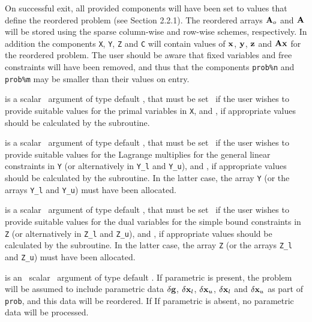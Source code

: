 \documentclass{galahad}
\begin{document}
\begin{description}

On successful exit, all provided components will have been set to values
that define the reordered problem (see Section 2.2.1). The reordered
arrays ${\mathbf{A}}_o$ and ${\mathbf{A}}$ will be stored using the sparse column-wise and
row-wise schemes, respectively. In addition the components
{\tt X}, {\tt Y}, {\tt Z} and {\tt C} will contain values of
${\mathbf{x}}$, ${\mathbf{y}}$, ${\mathbf{z}}$ and ${\mathbf{A}} {\mathbf{x}}$ for the reordered problem.
The user should be aware that fixed variables and free constraints will have
been removed, and thus that the components {\tt prob\%n} and {\tt prob\%m}
may be smaller than their values on entry.

 is a scalar \intentin\ argument of type default \logical, that
must be set \false\ if the user wishes to provide suitable values for the
primal variables in {\tt X}, and \true, if appropriate values should be
calculated by the subroutine.

 is a scalar \intentin\ argument of type default \logical, that
must be set \false\ if the user wishes to provide suitable values for the
Lagrange multiplies for the general linear constraints in {\tt Y}
(or alternatively in {\tt Y\_l} and {\tt Y\_u}),
and \true, if appropriate values should be calculated by the subroutine.
In the latter case, the array {\tt Y} (or the arrays {\tt Y\_l} and {\tt Y\_u})
must have been allocated.

 is a scalar \intentin\ argument of type default \logical, that
must be set \false\ if the user wishes to provide suitable values for the
dual variables for the simple bound constraints in {\tt Z}
(or alternatively in {\tt Z\_l} and {\tt Z\_u}), and \true,
if appropriate values should be calculated by the subroutine.
In the latter case, the array {\tt Z} (or the arrays {\tt Z\_l} and {\tt Z\_u})
must have been allocated.

is an \optional\ scalar \intentin\ argument of type default \logical.
If {parametric} is present, the problem will be assumed to include
parametric data $\delta {\mathbf{g}}$, $\delta {\mathbf{x}}_l$, $\delta {\mathbf{x}}_u$,
$\delta {\mathbf{x}}_l$ and $\delta {\mathbf{x}}_u$ as part of {\tt prob},
and this data will be reordered. If
If {parametric} is absent, no parametric data will be processed.

\end{description}
\end{document}
